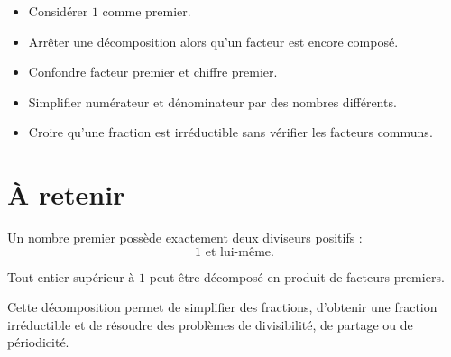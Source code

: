 \begin{itemize}
\item Considérer $1$ comme premier.
\item Arrêter une décomposition alors qu'un facteur est encore composé.
\item Confondre facteur premier et chiffre premier.
\item Simplifier numérateur et dénominateur par des nombres différents.
\item Croire qu'une fraction est irréductible sans vérifier les facteurs communs.
\end{itemize}

\section{À retenir}

\begin{aretenir}
Un nombre premier possède exactement deux diviseurs positifs :
\[
\boxed{1\text{ et lui-même}}.
\]

Tout entier supérieur à $1$ peut être décomposé en produit de facteurs premiers.

Cette décomposition permet de simplifier des fractions, d'obtenir une fraction irréductible et de résoudre des problèmes de divisibilité, de partage ou de périodicité.
\end{aretenir}
